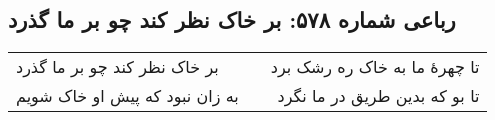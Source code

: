 \begin{center}
\section*{رباعی شماره ۵۷۸: بر خاک نظر کند چو بر ما گذرد}
\label{sec:0578}
\begin{longtable}{l p{0.5cm} r}
بر خاک نظر کند چو بر ما گذرد
&&
تا چهرهٔ ما به خاک ره رشک برد
\\
به زان نبود که پیش او خاک شویم
&&
تا بو که بدین طریق در ما نگرد
\\
\end{longtable}
\end{center}
